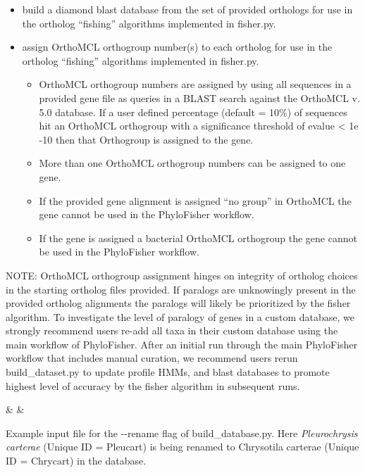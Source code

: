\documentclass{article}
\begin{document}
\begin{description}
\begin{itemize}
\begin{itemize}
                    \item build a diamond blast database from the set of provided orthologs for use in the ortholog “fishing” algorithms implemented in fisher.py.
                    \item assign OrthoMCL orthogroup number(s) to each ortholog for use in the ortholog “fishing” algorithms implemented in fisher.py.
                    \begin{itemize}
                        \item OrthoMCL orthogroup numbers are assigned by using all sequences in a provided gene file as queries in a BLAST search against the OrthoMCL v. 5.0 database. If a user defined percentage (default = 10\%) of sequences hit an OrthoMCL orthogroup with a significance threshold of evalue < 1e -10 then that Orthogroup is assigned to the gene.
                        \item More than one OrthoMCL orthogroup numbers can be assigned to one gene.
                        \item If the provided gene alignment is assigned “no group” in OrthoMCL the gene cannot be used in the PhyloFisher workflow.
                        \item If the gene is assigned a bacterial OrthoMCL orthogroup the gene cannot be used in the PhyloFisher workflow.
                    \end{itemize}
                \end{itemize}
            \end{itemize}
        \vspace{0.2cm}
        NOTE: OrthoMCL orthogroup assignment hinges on integrity of ortholog choices in the starting ortholog files provided. If paralogs are unknowingly present in the provided ortholog alignments the paralogs will likely be prioritized by the fisher algorithm. To investigate the level of paralogy of genes in a custom database, we strongly recommend users re-add all taxa in their custom database using the main workflow of PhyloFisher. After an initial run through the main PhyloFisher workflow that includes manual curation, we recommend users rerun build\_dataset.py to update profile HMMs, and blast databases to promote highest level of accuracy by the fisher algorithm in subsequent runs.
        \end{description}
        \vspace{0.5cm}
        \begin{table}[H]
        \centering
            {\csvcoli & \csvcolii & \csvcoliii}
            \caption{Example input file for the -\/-rename flag of build\_database.py. Here \textit{Pleurochrysis carterae} (Unique ID = Pleucart) is being renamed to Chrysotila carterae (Unique ID = Chrycart) in the database.}
            \label{Tab:rename}
        \end{table}
        
\end{document}

